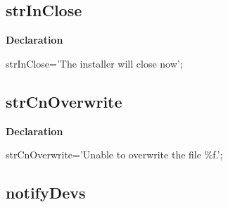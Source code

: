 \documentclass{report}
\newif\ifpdf
\begin{document}
\subsection*{strInClose}
\fi
\label{trstrings-strInClose}
\begin{list}{}{
\setlength{\itemindent}{0cm}
\setlength{\listparindent}{0cm}
\setlength{\leftmargin}{\evensidemargin}
\addtolength{\leftmargin}{\tmplength}
\settowidth{\labelsep}{X}
\addtolength{\leftmargin}{\labelsep}
\setlength{\labelwidth}{\tmplength}
}
\item[\textbf{Declaration}\hfill]
\ifpdf
\begin{flushleft}
\fi
\begin{ttfamily}
strInClose='The installer will close now';\end{ttfamily}

\ifpdf
\end{flushleft}
\fi

\end{list}
\ifpdf
\subsection*{\large{\textbf{strCnOverwrite}}\normalsize\hspace{1ex}\hrulefill}
\else
\subsection*{strCnOverwrite}
\fi
\label{trstrings-strCnOverwrite}
\begin{list}{}{
\setlength{\itemindent}{0cm}
\setlength{\listparindent}{0cm}
\setlength{\leftmargin}{\evensidemargin}
\addtolength{\leftmargin}{\tmplength}
\settowidth{\labelsep}{X}
\addtolength{\leftmargin}{\labelsep}
\setlength{\labelwidth}{\tmplength}
}
\item[\textbf{Declaration}\hfill]
\ifpdf
\begin{flushleft}
\fi
\begin{ttfamily}
strCnOverwrite='Unable to overwrite the file {\%}f.';\end{ttfamily}

\ifpdf
\end{flushleft}
\fi

\end{list}
\ifpdf
\subsection*{\large{\textbf{notifyDevs}}\normalsize\hspace{1ex}\hrulefill}
\else
\end{document}
